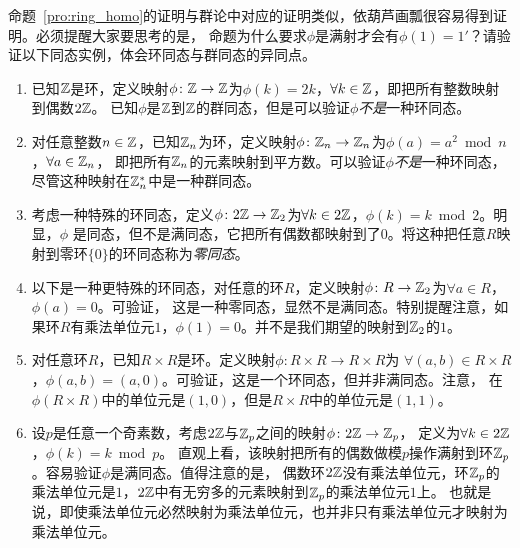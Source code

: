 \begin{example}
\label{exm:homo_onto}
命题~\ref{pro:ring_homo}的证明与群论中对应的证明类似，依葫芦画瓢很容易得到证明。必须提醒大家要思考的是，
命题为什么要求$\phi$是满射才会有$\phi(1) = 1'$？请验证以下同态实例，体会环同态与群同态的异同点。

\begin{enumerate}
\item 已知${\mathbb Z}$是环，定义映射$\phi\colon {\mathbb Z} \to {\mathbb Z}$为$\phi(k) = 2k$，$\forall k \in {\mathbb Z}$，即把所有整数映射到偶数$2{\mathbb Z}$。
已知$\phi$是${\mathbb Z}$到${\mathbb Z}$的群同态，但是可以验证$\phi$\emph{不是}一种环同态。

\item 对任意整数$n\in {\mathbb Z}$，已知${\mathbb Z}_n$为环，定义映射$\phi\colon {\mathbb Z}_n \to {\mathbb Z}_n$为$\phi(a) = a^2 \bmod n$，$\forall a \in {\mathbb Z}_n$，
即把所有${\mathbb Z}_n$的元素映射到平方数。可以验证$\phi$\emph{不是}一种环同态，尽管这种映射在${\mathbb Z}_n^*$中是一种群同态。

\item 考虑一种特殊的环同态，定义$\phi\colon 2{\mathbb Z} \to {\mathbb Z}_2$为$\forall k \in 2{\mathbb Z}$，$\phi(k) = k \bmod 2$。明显，$\phi$
是同态，但不是满同态，它把所有偶数都映射到了$0$。将这种把任意$R$映射到零环$\{0\}$的环同态称为\emph{零同态}。

\item 以下是一种更特殊的环同态，对任意的环$R$，定义映射$\phi\colon R \to {\mathbb Z}_2$为$\forall a \in R$，$\phi(a) = 0$。可验证，
这是一种零同态，显然不是满同态。特别提醒注意，如果环$R$有乘法单位元$1$，$\phi(1) = 0$。并不是我们期望的映射到${\mathbb Z}_2$的$1$。

\item 对任意环$R$，已知$R\times R$是环。定义映射$\phi\colon R\times R \to R\times R$为
$\forall (a, b)\in R\times R$，$\phi(a,b) = (a, 0)$。可验证，这是一个环同态，但并非满同态。注意，
在$\phi(R\times R)$中的单位元是$(1,0)$，但是$R\times R$中的单位元是$(1,1)$。

\item 设$p$是任意一个奇素数，考虑$2{\mathbb Z}$与${\mathbb Z}_p$之间的映射$\phi\colon 2{\mathbb Z} \to {\mathbb Z}_p$，
定义为$\forall k \in 2{\mathbb Z}$，$\phi(k) = k \bmod p$。
直观上看，该映射把所有的偶数做模$p$操作满射到环${\mathbb Z}_p$。容易验证$\phi$是满同态。值得注意的是，
偶数环$2{\mathbb Z}$没有乘法单位元，环${\mathbb Z}_p$的乘法单位元是$1$，$2{\mathbb Z}$中有无穷多的元素映射到${\mathbb Z}_p$的乘法单位元$1$上。
也就是说，即使乘法单位元必然映射为乘法单位元，也并非只有乘法单位元才映射为乘法单位元。

\end{enumerate}
\end{example}

